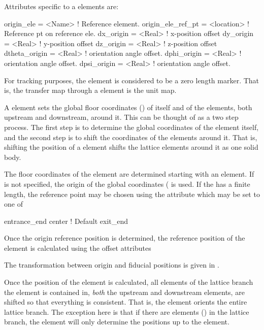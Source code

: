 Attributes specific to a  elements are:
\begin{example}
  origin_ele        = <Name>     ! Reference element.
  origin_ele_ref_pt = <location> ! Reference pt on reference ele.
  dx_origin         = <Real>     ! x-position offset
  dy_origin         = <Real>     ! y-position offset
  dz_origin         = <Real>     ! z-position offset
  dtheta_origin     = <Real>     ! orientation angle offset.
  dphi_origin       = <Real>     ! orientation angle offset.
  dpsi_origin       = <Real>     ! orientation angle offset.
\end{example}

For tracking purposes, the  element is considered to be a
zero length marker. That is, the transfer map through a 
element is the unit map.

A  element sets the global floor coordinates () of itself and of the
elements, both upstream and downstream, around it. This can be thought of as a two step process. The
first step is to determine the global coordinates of the  element itself, and the
second step is to shift the coordinates of the elements around it. That is, shifting the position
of a  element shifts the lattice elements around it as one solid body.

The floor coordinates of the  element are determined starting with an 
element. If  is not specified, the origin of the global coordinates (
is used. If the  has a finite length, the reference point may be chosen using the
 attribute which may be set to one of
\begin{example}
  entrance_end
  center         ! Default
  exit_end
\end{example}

Once the origin reference position is determined, the reference
position of the  element is calculated using the offset
attributes 
\begin{example}
\end{example}
The transformation between origin and fiducial positions is given in
.

Once the position of the  element is calculated, all elements of the lattice branch the
 element is contained in, {\em both} the upstream and downstream elements, are shifted
so that everything is consistent. That is, the  element orients the entire lattice
branch. The exception here is that if there are   elements ()
in the lattice branch, the  element will only determine the positions up to the
  element.

